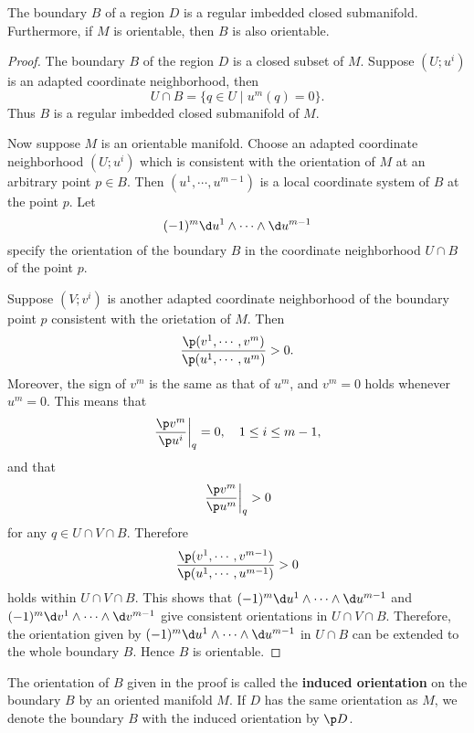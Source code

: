 \documentclass[11pt]{article}
\begin{document}
\begin{theorem}
    The boundary $B$ of a region $D$ is a regular imbedded closed submanifold. Furthermore, if $M$ is orientable, then $B$ is also orientable. 
\end{theorem}
\begin{proof}
    The boundary $B$ of the region $D$ is a closed subset of $M$. Suppose $(U;u^i)$ is an adapted coordinate neighborhood, then $$U \cap B = \{q \in U \mid u^m(q) = 0\}.$$ Thus $B$ is a regular imbedded closed submanifold of $M$. 

    Now suppose $M$ is an orientable manifold. Choose an adapted coordinate neighborhood $(U;u^i)$ which is consistent with the orientation of $M$ at an arbitrary point $p \in B$. Then $(u^1, \cdots, u^{m-1})$ is a local coordinate system of $B$ at the point $p$. Let $$(-1)^m \d u^1 \wedge \cdots \wedge \d u^{m-1}$$ specify the orientation of the boundary $B$ in the coordinate neighborhood $U \cap B$ of the point $p$. 

    Suppose $(V;v^i)$ is another adapted coordinate neighborhood of the boundary point $p$ consistent with the orietation of $M$. Then $$\frac{\p(v^1, \cdots, v^m)}{\p(u^1, \cdots, u^m)} > 0.$$ Moreover, the sign of $v^m$ is the same as that of $u^m$, and $v^m = 0$ holds whenever $u^m = 0$. This means that $$\left.\frac{\p v^m}{\p u^i}\right|_q = 0, \quad 1 \le i \le m - 1,$$ and that $$\left.\frac{\p v^m}{\p u^m}\right|_q > 0$$ for any $q \in U \cap V \cap B$. Therefore $$\frac{\p(v^1, \cdots, v^{m-1})}{\p(u^1, \cdots, u^{m-1})} > 0$$ holds within $U \cap V \cap B$. This shows that $(-1)^m \d u^1 \wedge \cdots \wedge \d u^{m-1}$ and $(-1)^m \d v^1 \wedge \cdots \wedge \d v^{m-1}$ give consistent orientations in $U \cap V \cap B$. Therefore, the orientation given by $(-1)^m \d u^1 \wedge \cdots \wedge \d u^{m-1}$ in $U \cap B$ can be extended to the whole boundary $B$. Hence $B$ is orientable. 
\end{proof}

The orientation of $B$ given in the proof is called the \textbf{induced orientation} on the boundary $B$ by an oriented manifold $M$. If $D$ has the same orientation as $M$, we denote the boundary $B$ with the induced orientation by $\p D$.  
\end{document}
